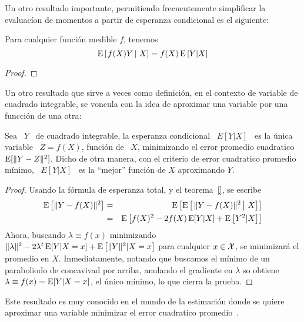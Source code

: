 Un  otro   resultado  importante,  permitiendo   frecuentemente  simplificar  la
evaluac\'ion de momentos a partir de esperanza condicional es el siguiente:
%
\begin{teorema}\label{Teo:MP:EsperanzaF(X)Y}
%
  Para cualquier funci\'on medible $f$, tenemos
  \[
  \operatorname{E}\left[ \left. f(X) Y \, \right| \, X \right] = f(X) \operatorname{E}\left[ Y | X\right]
  \]
\end{teorema}
%
\begin{proof}
\end{proof}


Un  otro resultado  que  sirve a  veces  como definici\'on,  en  el contexto  de
variable  de  cuadrado integrable,  se  voncula con  la  idea  de aproximar  una
variable por una funcci\'on de una otra:
%
\begin{teorema}
  Sea \ $Y$  \ de cuadrado integrable, la esperanza condicional  \ $E[Y|X]$ \ es
  la \'unica  variable \ $Z  = f(X)$, funci\'on  de \ $X$, minimizando  el error
  promedio cuadratico \ $\operatorname{E}[  \| Y - Z \|^2 ]$.  Dicho  de otra manera, con el
  criterio de error  cuadratico promedio m\'inimo, \ $E[Y|X]$  \ es la ``mejor''
  funci\'on de $X$ aproximando $Y$.
\end{teorema}
\begin{proof}
Usando la f\'ormula de esperanza total, y el teorema~\ref{}, se escribe
%
\begin{eqnarray*}
\Esp\left[ \| Y - f(X) \|^2 \right] & = & \Esp\left[ \Esp\left[ \left. \| Y -
f(X) \|^2 \, \right| \, X \right] \right]\\
%
& = & \Esp\left[ f(X)^2 - 2 f(X) \Esp[Y|X] +  \Esp\left[ Y^2 | X \right] \right]
\end{eqnarray*}
%
Ahora, buscando $\lambda \equiv f(x)$  minimizando $\| \lambda\|^2 - 2 \lambda^t
\operatorname{E}[Y|X=x] + \operatorname{E}\left[ \| Y \|^2 |  X=x \right]$ para cualquier $x \in \mathcal{X}$, se
minimizar\'a  el  promedio en  $X$.   Inmediatamente,  notando  que buscamos  el
m\'inimo de  un paraboliodo de concavivad  por arriba, anulando  el gradiente en
$\lambda$ so obtiene  $\lambda \equiv f(x) = \operatorname{E}[Y|X=x]$,  el \'unico m\'inimo,
lo que cierra la prueba.
\end{proof}
%
Este resultado  es muy conocido en el  mundo de la estimaci\'on  donde se quiere
aproximar una variable minimizar el error cuadratico promedio~\cite{Kay93, Rob07}.


